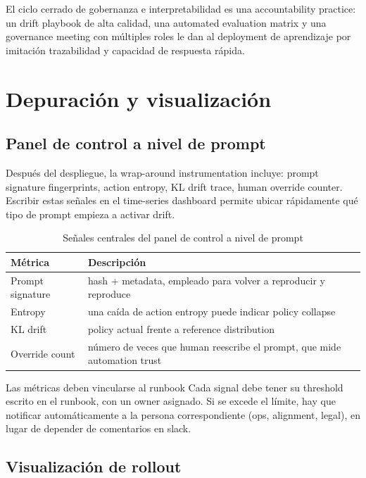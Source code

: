 \documentclass[a4paper]{article}
\begin{document}
El ciclo cerrado de gobernanza e interpretabilidad es una accountability practice: un drift playbook de alta calidad, una automated evaluation matrix y una governance meeting con múltiples roles le dan al deployment de aprendizaje por imitación trazabilidad y capacidad de respuesta rápida.
\section{Depuración y visualización}

\subsection{Panel de control a nivel de prompt}

Después del despliegue, la wrap-around instrumentation incluye: prompt signature fingerprints, action entropy, KL drift trace, human override counter. Escribir estas señales en el time-series dashboard permite ubicar rápidamente qué tipo de prompt empieza a activar drift.

\begin{table}[H]
\centering
\begin{tabular}{p{} p{}}
\toprule
Métrica & Descripción \\
\midrule
Prompt signature & hash + metadata, empleado para volver a reproducir y reproduce \\
Entropy & una caída de action entropy puede indicar policy collapse \\
KL drift & policy actual frente a reference distribution \\
Override count & número de veces que human reescribe el prompt, que mide automation trust \\
\bottomrule
\end{tabular}
\caption{Señales centrales del panel de control a nivel de prompt}
\end{table}

\begin{importantbox}{Las métricas deben vincularse al runbook}
Cada signal debe tener su threshold escrito en el runbook, con un owner asignado. Si se excede el límite, hay que notificar automáticamente a la persona correspondiente (ops, alignment, legal), en lugar de depender de comentarios en slack.
\end{importantbox}

\subsection{Visualización de rollout}
\end{document}
